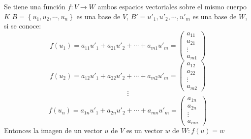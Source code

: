 Se tiene una función \(f:V \rightarrow W\) ambos espacios vectoriales sobre el mismo cuerpo \(K\) \(B=\left\{u_1,u_2,\cdots,u_n \right\}\) es una base de \(V\), \(B'={u'_1, u'_2, \cdots, u'_m}\) es una base de \(W\), si se conoce:
\[
f(u_1) = a_{11} u'_1 + a_{21} u'_2 + \cdots + a_{m1} u'_m
 = \begin{pmatrix}
  a_{11} \\
  a_{21} \\
  \vdots \\
  a_{m1}
 \end{pmatrix}
\]
\[
f(u_2) = a_{12} u'_1 + a_{22} u'_2 + \cdots + a_{m2} u'_m
 = \begin{pmatrix}
  a_{12} \\
  a_{22} \\
  \vdots \\
  a_{m2}
 \end{pmatrix}
\]
\[
\vdots
\]
\[
f(u_n) = a_{1n} u'_1 + a_{2n} u'_2 + \cdots + a_{mn} u'_m
 = \begin{pmatrix}
  a_{1n} \\
  a_{2n} \\
  \vdots \\
  a_{mn}
 \end{pmatrix}
\]
Entonces la imagen de un vector \(u\) de \(V\) es un vector \(w\) de \(W:f(u) = w\)
